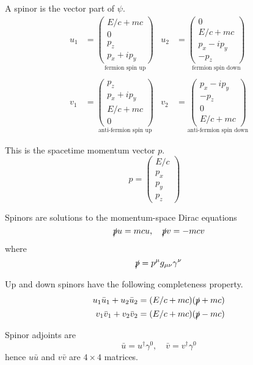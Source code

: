 \documentclass[12pt]{article}
\begin{document}
A spinor is the vector part of $\psi$.
\begin{align*}
u_1&=\underset{\text{fermion spin up}}{\begin{pmatrix}E/c+mc\\0\\p_z\\p_x+ip_y\end{pmatrix}}
& u_2&=\underset{\text{fermion spin down}}{\begin{pmatrix}0\\E/c+mc\\p_x-ip_y\\-p_z\end{pmatrix}}
\\
\\
v_1&=\underset{\text{anti-fermion spin up}}{\begin{pmatrix}p_z\\p_x+ip_y\\E/c+mc\\0\end{pmatrix}}
& v_2&=\underset{\text{anti-fermion spin down}}{\begin{pmatrix}p_x-ip_y\\-p_z\\0\\E/c+mc\end{pmatrix}}
\end{align*}

This is the spacetime momentum vector $p$.
\begin{equation*}
p=\begin{pmatrix}E/c\\p_x\\p_y\\p_z\end{pmatrix}\quad
\end{equation*}

Spinors are solutions to the momentum-space Dirac equations
\begin{equation*}
\slashed pu=mcu,
\quad
\slashed pv=-mcv
\end{equation*}
where
\begin{equation*}
\slashed p=p^\mu g_{\mu\nu}\gamma^\nu
\end{equation*}

Up and down spinors have the following completeness property.
\begin{align*}
u_1\bar u_1+u_2\bar u_2&=(E/c+mc)(\slashed p+mc)
\\
v_1\bar v_1+v_2\bar v_2&=(E/c+mc)(\slashed p-mc)
\end{align*}

Spinor adjoints are
\begin{equation*}
\bar u=u^\dag\gamma^0,
\quad
\bar v=v^\dag\gamma^0
\end{equation*}
hence $u\bar u$ and $v\bar v$ are $4\times4$ matrices.
\end{document}
